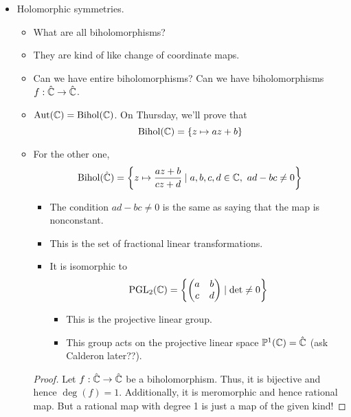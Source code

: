 \documentclass[../notes.tex]{subfiles}
\begin{document}
\begin{itemize}
    \item Holomorphic symmetries.
    \begin{itemize}
        \item What are all biholomorphisms?
        \item They are kind of like change of coordinate maps.
        \item Can we have entire biholomorphisms? Can we have biholomorphisms $f:\hat{\mathbb{C}}\to\hat{\mathbb{C}}$.
        \item $\operatorname{Aut}(\mathbb{C})=\operatorname{Bihol}(\mathbb{C})$. On Thursday, we'll prove that
        \begin{equation*}
            \operatorname{Bihol}(\mathbb{C}) = \{z\mapsto az+b\}
        \end{equation*}
        \item For the other one,
        \begin{equation*}
            \operatorname{Bihol}(\hat{\mathbb{C}}) = \left\{ z\mapsto\frac{az+b}{cz+d}\mid a,b,c,d\in\mathbb{C},\ ad-bc\neq 0 \right\}
        \end{equation*}
        \begin{itemize}
            \item The condition $ad-bc\neq 0$ is the same as saying that the map is nonconstant.
            \item This is the set of fractional linear transformations.
            \item It is isomorphic to
            \begin{equation*}
                \operatorname{PGL}_2(\mathbb{C}) = \left\{
                    \begin{pmatrix}
                        a & b\\
                        c & d\\
                    \end{pmatrix}
                    \mid \det\neq 0
                \right\}
            \end{equation*}
            \begin{itemize}
                \item This is the projective linear group.
                \item This group acts on the projective linear space $\mathbb{P}^1(\mathbb{C})=\hat{\mathbb{C}}$ (ask Calderon later??).
            \end{itemize}
        \end{itemize}
        \begin{proof}
            Let $f:\hat{\mathbb{C}}\to\hat{\mathbb{C}}$ be a biholomorphism. Thus, it is bijective and hence $\deg(f)=1$. Additionally, it is meromorphic and hence rational map. But a rational map with degree 1 is just a map of the given kind!

\end{proof}
\end{itemize}
\end{itemize}
\end{document}
